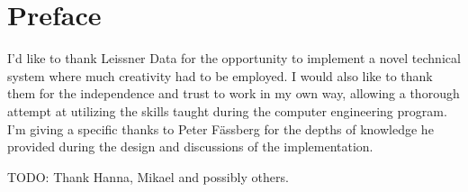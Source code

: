 \thispagestyle{plain}

\section*{Preface}

I'd like to thank Leissner Data for the opportunity to implement a
novel technical system where much creativity had to be employed. I
would also like to thank them for the independence and trust to
work in my own way, allowing a thorough attempt at utilizing the
skills taught during the computer engineering program. I'm giving a
specific thanks to Peter Fässberg for the depths of knowledge he
provided during the design and discussions of the implementation.

TODO: Thank Hanna, Mikael and possibly others.
